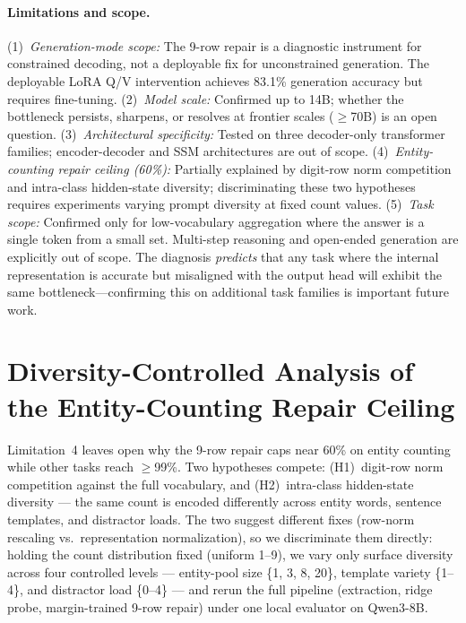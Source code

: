 \documentclass{article}
\begin{document}
\paragraph{Limitations and scope.}
(1)~\emph{Generation-mode scope:} The 9-row repair is a diagnostic
instrument for constrained decoding, not a deployable fix for unconstrained
generation. The deployable LoRA Q/V intervention achieves 83.1\% generation
accuracy but requires fine-tuning. (2)~\emph{Model scale:} Confirmed up to
14B; whether the bottleneck persists, sharpens, or resolves at frontier scales
($\geq$70B) is an open question. (3)~\emph{Architectural specificity:} Tested
on three decoder-only transformer families; encoder-decoder and SSM
architectures are out of scope. (4)~\emph{Entity-counting repair ceiling
(60\%):} Partially explained by digit-row norm competition and intra-class
hidden-state diversity; discriminating these two hypotheses requires
experiments varying prompt diversity at fixed count values. (5)~\emph{Task
scope:} Confirmed only for low-vocabulary aggregation where the answer is a
single token from a small set. Multi-step reasoning and open-ended generation
are explicitly out of scope. The diagnosis \emph{predicts} that any task where
the internal representation is accurate but misaligned with the output head
will exhibit the same bottleneck---confirming this on additional task families
is important future work.

\section{Diversity-Controlled Analysis of the Entity-Counting Repair Ceiling}
\label{sec:diversity}

Limitation~4 leaves open why the 9-row repair caps near 60\% on entity counting while other tasks reach $\geq$99\%. Two hypotheses compete: (H1)~digit-row norm competition against the full vocabulary, and (H2)\ intra-class hidden-state diversity --- the same count is encoded differently across entity words, sentence templates, and distractor loads. The two suggest different fixes (row-norm rescaling vs.\ representation normalization), so we discriminate them directly: holding the count distribution fixed (uniform 1--9), we vary only surface diversity across four controlled levels --- entity-pool size \{1, 3, 8, 20\}, template variety \{1--4\}, and distractor load \{0--4\} --- and rerun the full pipeline (extraction, ridge probe, margin-trained 9-row repair) under one local evaluator on Qwen3-8B.
\end{document}
